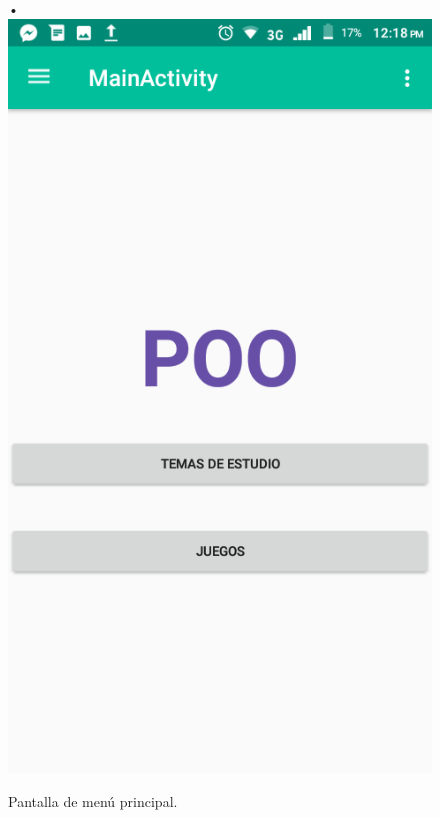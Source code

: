 \begin{center}\begin{figure}[H]
•\includegraphics[scale=0.3]{img/3.png} 
\caption{Pantalla de menú principal.}

\end{figure}
\end{center}

